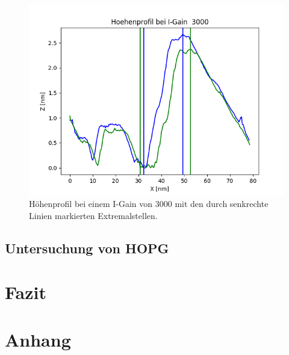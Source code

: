 \documentclass[12pt,a4paper]{article}
\begin{document}
\begin{figure}
\centering
\includegraphics[scale=0.8]{Bilder/Profil_IGain_3000_Peakbestimmung.png}
\caption{Höhenprofil bei einem I-Gain von 3000 mit den durch senkrechte Linien markierten Extremalstellen.}
\label{fig:Gold_IGain_Extremalstellen}
\end{figure}

\subsection{Untersuchung von HOPG}

\section{Fazit}

\section{Anhang}
\end{document}
